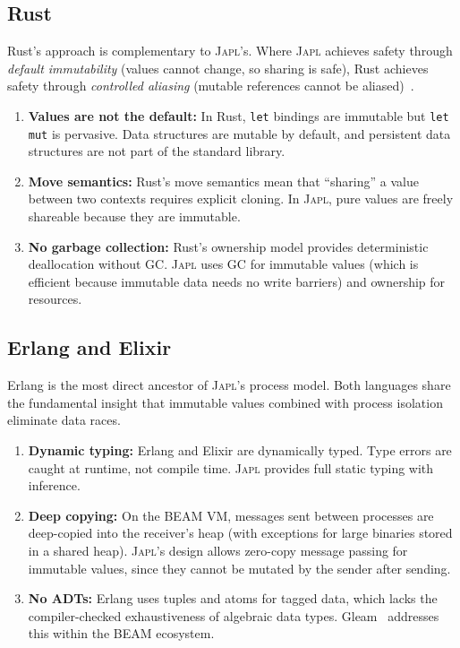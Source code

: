 \documentclass[11pt]{article}
\theoremstyle{definition}
\theoremstyle{remark}
\newcommand{\japl}{\textsc{Japl}}
\begin{document}
\subsection{Rust}

Rust's approach is complementary to \japl{}'s.  Where \japl{} achieves
safety through \emph{default immutability} (values cannot change, so
sharing is safe), Rust achieves safety through \emph{controlled
aliasing} (mutable references cannot be aliased)~\cite{jung2017rustbelt}.

\begin{enumerate}
  \item \textbf{Values are not the default:} In Rust, \texttt{let}
    bindings are immutable but \texttt{let mut} is pervasive.  Data
    structures are mutable by default, and persistent data structures
    are not part of the standard library.

  \item \textbf{Move semantics:} Rust's move semantics mean that
    ``sharing'' a value between two contexts requires explicit cloning.
    In \japl{}, pure values are freely shareable because they are
    immutable.

  \item \textbf{No garbage collection:} Rust's ownership model
    provides deterministic deallocation without GC.  \japl{} uses GC
    for immutable values (which is efficient because immutable data
    needs no write barriers) and ownership for resources.
\end{enumerate}

\subsection{Erlang and Elixir}

Erlang is the most direct ancestor of \japl{}'s process model.  Both
languages share the fundamental insight that immutable values combined
with process isolation eliminate data races.

\begin{enumerate}
  \item \textbf{Dynamic typing:} Erlang and Elixir are dynamically
    typed.  Type errors are caught at runtime, not compile time.
    \japl{} provides full static typing with inference.

  \item \textbf{Deep copying:} On the BEAM VM, messages sent between
    processes are deep-copied into the receiver's heap (with
    exceptions for large binaries stored in a shared heap).  \japl{}'s
    design allows zero-copy message passing for immutable values,
    since they cannot be mutated by the sender after sending.

  \item \textbf{No ADTs:} Erlang uses tuples and atoms for tagged data,
    which lacks the compiler-checked exhaustiveness of algebraic data
    types.  Gleam~\cite{gleam2024} addresses this within the BEAM
    ecosystem.
\end{enumerate}
\end{document}
